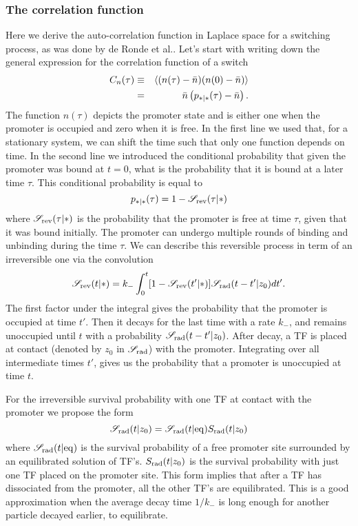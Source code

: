 \subsubsection{The correlation function}
Here we derive the auto-correlation function in Laplace space for a switching process, as was done by de Ronde et al.\cite{DeRonde2012}. Let's start with writing down the general expression for the correlation function of a switch
\begin{eqnarray}
 C_n(\tau) & \equiv & \left\langle (n(\tau) - \bar{n})(n(0) - \bar{n}) \right\rangle \\
  	& = & \bar{n} \left( p_{*|*}(\tau)-\bar{n} \right).
 \elabel{corr_func}
\end{eqnarray}
The function $n(\tau)$ depicts the promoter state and is either one when the promoter is occupied and zero when it is free. In the first line we used that, for a stationary system, we can shift the time such that only one function depends on time. In the second line we introduced the conditional probability that given the promoter was bound at $t=0$, what is the probability that it is bound at a later time $\tau$. This conditional probability is equal to
\begin{equation}
 p_{*|*}(\tau) = 1 - \mathscr{S}_{\rm rev}(\tau|*)
\end{equation}
where $\mathscr{S}_{\rm rev}(\tau|*)$ is the probability that the promoter is free at time $\tau$, given that it was bound initially. The promoter can undergo multiple rounds of binding and unbinding during the time $\tau$. We can describe this reversible process in term of an irreversible one via the convolution \cite{Agmon1990}
\begin{equation}
 \mathscr{S}_{\rm rev}(t|*) = k_- \int_0^t [1-\mathscr{S}_{\rm rev}(t'|*)]\mathscr{S}_{\rm rad}(t-t'|z_0)dt'.
 \elabel{rev_conv}
\end{equation}
The first factor under the integral gives the probability that the promoter is occupied at time $t'$. Then it decays for the last time with a rate $k_-$, and remains unoccupied until $t$ with a probability $\mathscr{S}_{\rm rad}(t-t'|z_0)$. After decay, a TF is placed at contact (denoted by $z_0$ in $\mathscr{S}_{\rm rad}$) with the promoter. Integrating over all intermediate times $t'$, gives us the probability that a promoter is unoccupied at time $t$. 

For the irreversible survival probability with one TF at contact with the promoter we propose the form
\begin{equation}
 \mathscr{S}_{\rm rad}(t|z_0) = \mathscr{S}_{\rm rad}(t|{\rm eq}) S_{\rm rad}(t|z_0)
 \elabel{Def_Ssi}
\end{equation}
where $\mathscr{S}_{\rm rad}(t|{\rm eq})$ is the survival probability of a free promoter site surrounded by an equilibrated solution of TF's. $S_{\rm rad}(t|z_0)$ is the survival probability with just one TF placed on the promoter site. This form implies that after a TF has dissociated from the promoter, all the other TF's are equilibrated. This is a good approximation when the average decay time $1/k_-$ is long enough for another particle decayed earlier, to equilibrate. 

